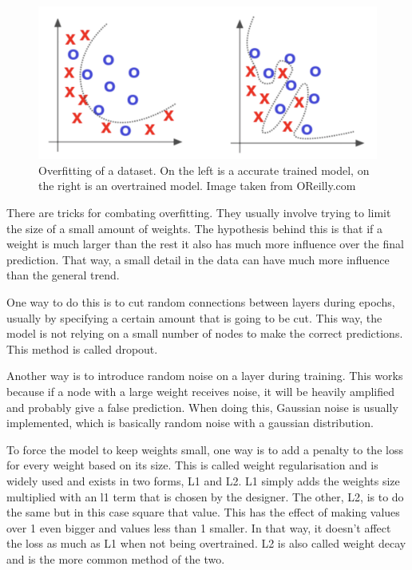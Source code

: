 \begin{figure}[hbtp]
\begin{center}
\includegraphics[width = 1.0\textwidth]{./Images/overfitting.jpg} 
\caption{Overfitting of a dataset. On the left is a accurate trained model, on the right is an overtrained model. Image taken from OReilly.com}
\end{center}
\end{figure}

\cite{overfitting}

There are tricks for combating overfitting. They usually involve trying to limit the size of a small amount of weights.
The hypothesis behind this is that if a weight is much larger than the rest it also has much more influence over the final prediction. That way, a small detail in the data can have much more influence than the general trend.

One way to do this is to cut random connections between layers during epochs, usually by specifying a certain amount that is going to be cut.
This way, the model is not relying on a small number of nodes to make the correct predictions. This method is called dropout.

Another way is to introduce random noise on a layer during training. This works because if a node with a large weight receives noise, it will be heavily amplified and probably give a false prediction.
When doing this, Gaussian noise is usually implemented, which is basically random noise with a gaussian distribution.

To force the model to keep weights small, one way is to add a penalty to the loss for every weight based on its size. 
This is called weight regularisation and is widely used and exists in two forms, L1 and L2.
L1 simply adds the weights size multiplied with an l1 term that is chosen by the designer.
The other, L2, is to do the same but in this case square that value. This has the effect of making values over 1 even bigger and values less than 1 smaller.
In that way, it doesn't affect the loss as much as L1 when not being overtrained. L2 is also called weight decay and is the more common method of the two.

